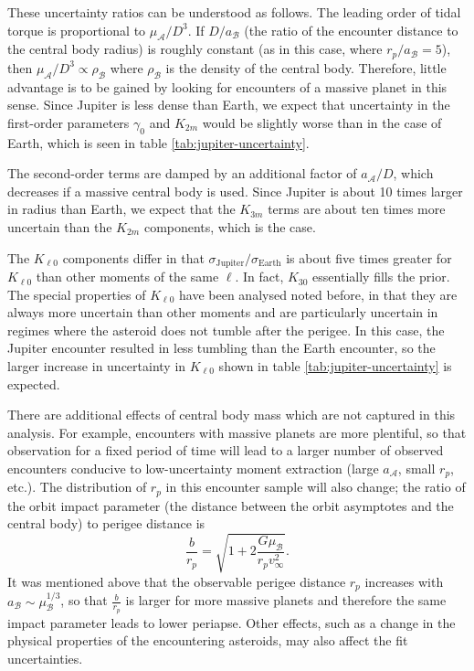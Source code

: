 \documentclass[fleqn,usenatbib]{mnras}
\begin{document}
These uncertainty ratios can be understood as follows. The leading order of tidal torque is proportional to $\mu_\mathcal{A} / D^3$. If $D/a_\mathcal{B}$ (the ratio of the encounter distance to the central body radius) is roughly constant (as in this case, where $r_p/a_\mathcal{B}=5$), then $\mu_\mathcal{A} / D^3 \propto \rho_\mathcal{B}$ where $\rho_\mathcal{B}$ is the density of the central body. Therefore, little advantage is to be gained by looking for encounters of a massive planet in this sense. Since Jupiter is less dense than Earth, we expect that uncertainty in the first-order parameters $\gamma_0$ and $K_{2m}$ would be slightly worse than in the case of Earth, which is seen in table \ref{tab:jupiter-uncertainty}.

The second-order terms are damped by an additional factor of $a_\mathcal{A}/D$, which decreases if a massive central body is used. Since Jupiter is about 10 times larger in radius than Earth, we expect that the $K_{3m}$ terms are about ten times more uncertain than the $K_{2m}$ components, which is the case.

The $K_{\ell 0}$ components differ in that $\sigma_\text{Jupiter}/\sigma_\text{Earth}$ is about five times greater for $K_{\ell 0}$ than other moments of the same $\ell$. In fact, $K_{30}$ essentially fills the prior. The special properties of $K_{\ell 0}$ have been analysed noted before, in that they are always more uncertain than other moments and are particularly uncertain in regimes where the asteroid does not tumble after the perigee. In this case, the Jupiter encounter resulted in less tumbling than the Earth encounter, so the larger increase in uncertainty in $K_{\ell 0}$ shown in table \ref{tab:jupiter-uncertainty} is expected.

There are additional effects of central body mass which are not captured in this analysis. For example, encounters with massive planets are more plentiful, so that observation for a fixed period of time will lead to a larger number of observed encounters conducive to low-uncertainty moment extraction (large $a_\mathcal{A}$, small $r_p$, etc.). The distribution of $r_p$ in this encounter sample will also change; the ratio of the orbit impact parameter (the distance between the orbit asymptotes and the central body) to perigee distance is 
\begin{equation}
  \frac{b}{r_p} = \sqrt{1+2\frac{G\mu_\mathcal{B}}{r_p v_\infty^2}}.
\end{equation}
It was mentioned above that the observable perigee distance $r_p$ increases with $a_\mathcal{B} \sim \mu_\mathcal{B}^{1/3}$, so that $\frac{b}{r_p}$ is larger for more massive planets and therefore the same impact parameter leads to lower periapse. Other effects, such as a change in the physical properties of the encountering asteroids, may also affect the fit uncertainties.
\end{document}
